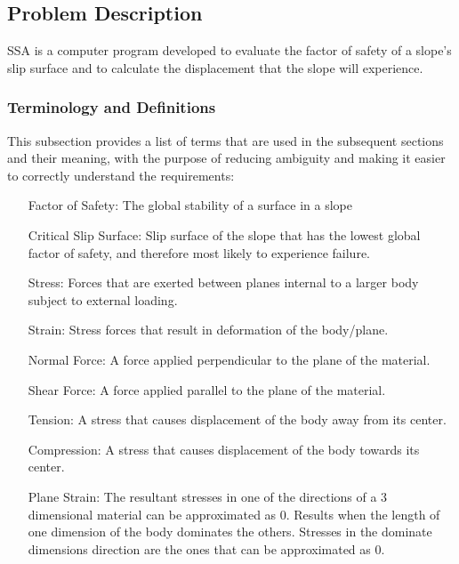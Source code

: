 \documentclass[12pt]{article}
\begin{document}
\subsection{Problem Description}
\label{Sec:ProbDesc}
SSA is a computer program developed to evaluate the factor of safety of a slope's slip surface and to calculate the displacement that the slope will experience.
\subsubsection{Terminology and Definitions}
\label{Sec:TermandDefi}
This subsection provides a list of terms that are used in the subsequent sections and their meaning, with the purpose of reducing ambiguity and making it easier to correctly understand the requirements:
\begin{itemize}
\item[Factor of Safety:]The global stability of a surface in a slope
\item[Critical Slip Surface:]Slip surface of the slope that has the lowest global factor of safety, and therefore most likely to experience failure.
\item[Stress:]Forces that are exerted between planes internal to a larger body subject to external loading.
\item[Strain:]Stress forces that result in deformation of the body/plane.
\item[Normal Force:]A force applied perpendicular to the plane of the material.
\item[Shear Force:]A force applied parallel to the plane of the material.
\item[Tension:]A stress that causes displacement of the body away from its center.
\item[Compression:]A stress that causes displacement of the body towards its center.
\item[Plane Strain:]The resultant stresses in one of the directions of a 3 dimensional material can be approximated as 0. Results when the length of one dimension of the body dominates the others. Stresses in the dominate dimensions direction are the ones that can be approximated as 0.
\end{itemize}
\end{document}
